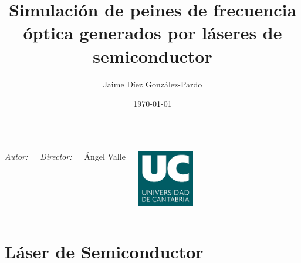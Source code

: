 \documentclass[xcolor=dvipsnames]{beamer}
\title[]{Simulación de peines de frecuencia óptica generados por láseres de semiconductor} %
\author[Jaime Díez]{Jaime Díez González-Pardo } %
\institute[UC]{Universidad de Cantabria}
\date{ \today} %
\begin{document}
	
		\begingroup
            \makeatletter
            \setlength{\hoffset}{-.5\beamer@sidebarwidth}
            \makeatother
            \begin{frame}[plain]
                    \vspace{1cm}
                    \begin{center}
                        {\fontsize{20pt}{24pt}\selectfont {Simulación de Peines de Frecuencia Óptica Generados por Láseres de Semiconductor}}
                    \end{center}
                    \vspace{1cm}

                \begin{columns}[onlytextwidth,T]
                    \column{\dimexpr\linewidth-35mm}%
                        
                        \normalsize
                        	\textit{\tiny Autor:}

                            \insertauthor

                            \textit{\tiny Director:}

                            Ángel Valle

                    \column{35mm}
                        \includegraphics[width=25mm]{../download.png}

                \end{columns}
                
                \vspace{0.5cm}
                \begin{center}
                    \insertdate
                \end{center}
            \end{frame}
        \endgroup


		\section{Láser de Semiconductor}
\end{document}
